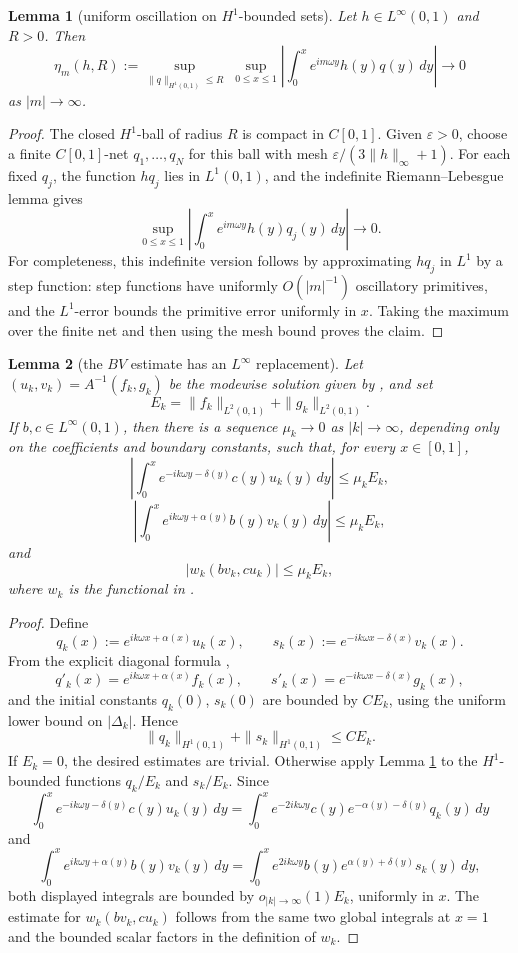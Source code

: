\documentclass[11pt]{article}
\newtheorem{lemma}{Lemma}
\newcommand{\eps}{\varepsilon}
\newcommand{\om}{\omega}
\newcommand{\al}{\alpha}
\newcommand{\de}{\delta}
\newcommand{\Linfty}{L^\infty}
\begin{document}
\begin{lemma}[uniform oscillation on \(H^1\)-bounded sets]
\label{lem:uniform-rl}
Let \(h\in\Linfty(0,1)\) and \(R>0\). Then
\[
  \eta_m(h,R):=
  \sup_{\|q\|_{H^1(0,1)}\le R}\;
  \sup_{0\le x\le 1}
  \left|\int_0^x e^{im\om y}h(y)q(y)\,dy\right|
  \longrightarrow 0
\]
as \(|m|\to\infty\).
\end{lemma}

\begin{proof}
The closed \(H^1\)-ball of radius \(R\) is compact in \(C[0,1]\). Given
\(\eps>0\), choose a finite \(C[0,1]\)-net \(q_1,\ldots,q_N\) for this ball
with mesh \(\eps/(3\|h\|_\infty+1)\). For each fixed \(q_j\), the function
\(h q_j\) lies in \(L^1(0,1)\), and the indefinite Riemann--Lebesgue lemma
gives
\[
  \sup_{0\le x\le 1}
  \left|\int_0^x e^{im\om y}h(y)q_j(y)\,dy\right|\to 0 .
\]
For completeness, this indefinite version follows by approximating
\(h q_j\) in \(L^1\) by a step function: step functions have uniformly
\(O(|m|^{-1})\) oscillatory primitives, and the \(L^1\)-error bounds the
primitive error uniformly in \(x\). Taking the maximum over the finite net
and then using the mesh bound proves the claim.
\end{proof}

\begin{lemma}[the \(BV\) estimate has an \(L^\infty\) replacement]
\label{lem:mode-decay}
Let \((u_k,v_k)=A^{-1}(f_k,g_k)\) be the modewise solution given by
\cite[(3.6)]{KmitRecke2007}, and set
\[
  E_k=\|f_k\|_{L^2(0,1)}+\|g_k\|_{L^2(0,1)}.
\]
If \(b,c\in\Linfty(0,1)\), then there is a sequence \(\mu_k\to 0\) as
\(|k|\to\infty\), depending only on the coefficients and boundary constants,
such that, for every \(x\in[0,1]\),
\[
\left|
\int_0^x e^{-ik\om y-\de(y)}c(y)u_k(y)\,dy
\right|
\le \mu_k E_k,
\]
\[
\left|
\int_0^x e^{ik\om y+\al(y)}b(y)v_k(y)\,dy
\right|
\le \mu_k E_k,
\]
and
\[
  |w_k(bv_k,cu_k)|\le \mu_k E_k,
\]
where \(w_k\) is the functional in \cite[(3.7)]{KmitRecke2007}.
\end{lemma}

\begin{proof}
Define
\[
  q_k(x):=e^{ik\om x+\al(x)}u_k(x),\qquad
  s_k(x):=e^{-ik\om x-\de(x)}v_k(x).
\]
From the explicit diagonal formula \cite[(3.6)]{KmitRecke2007},
\[
  q'_k(x)=e^{ik\om x+\al(x)}f_k(x),\qquad
  s'_k(x)=e^{-ik\om x-\de(x)}g_k(x),
\]
and the initial constants \(q_k(0)\), \(s_k(0)\) are bounded by
\(C E_k\), using the uniform lower bound on \(|\Delta_k|\). Hence
\[
  \|q_k\|_{H^1(0,1)}+\|s_k\|_{H^1(0,1)}\le C E_k .
\]
If \(E_k=0\), the desired estimates are trivial. Otherwise apply
Lemma \ref{lem:uniform-rl} to the \(H^1\)-bounded functions \(q_k/E_k\) and
\(s_k/E_k\). Since
\[
  \int_0^x e^{-ik\om y-\de(y)}c(y)u_k(y)\,dy
  =
  \int_0^x e^{-2ik\om y}
  c(y)e^{-\al(y)-\de(y)}q_k(y)\,dy
\]
and
\[
  \int_0^x e^{ik\om y+\al(y)}b(y)v_k(y)\,dy
  =
  \int_0^x e^{2ik\om y}
  b(y)e^{\al(y)+\de(y)}s_k(y)\,dy,
\]
both displayed integrals are bounded by \(o_{|k|\to\infty}(1)E_k\),
uniformly in \(x\). The estimate for \(w_k(bv_k,cu_k)\) follows from the same
two global integrals at \(x=1\) and the bounded scalar factors in the
definition of \(w_k\).
\end{proof}
\end{document}
